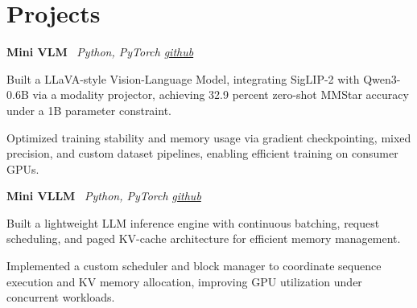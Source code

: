 \section{Projects}

    \hspace{0.5em} \textbf{Mini VLM} \textbar \  \textit{Python, PyTorch}
\hfill \textit{\href{https://github.com/knarfthekant/mini-vlm}{github}}
    \vspace{0.10 cm}
    \begin{onecolentry}
        \begin{highlights}
            \item Built a LLaVA-style Vision-Language Model, integrating SigLIP-2 with Qwen3-0.6B via a modality projector, achieving 32.9 percent zero-shot MMStar accuracy under a 1B parameter constraint.
            \item Optimized training stability and memory usage via gradient checkpointing, mixed precision, and custom dataset pipelines, enabling efficient training on consumer GPUs.
        \end{highlights}
    \end{onecolentry}
    \vspace{0.10 cm}

    \hspace{0.5em} \textbf{Mini VLLM} \textbar \  \textit{Python, PyTorch}
\hfill \textit{\href{https://github.com/knarfthekant/mini-vllm}{github}}
    \vspace{0.10 cm}
    \begin{onecolentry}
        \begin{highlights}
            \item Built a lightweight LLM inference engine with continuous batching, request scheduling, and paged KV-cache architecture for efficient memory management.
            \item Implemented a custom scheduler and block manager to coordinate sequence execution and KV memory allocation, improving GPU utilization under concurrent workloads.
        \end{highlights}
    \end{onecolentry}
    \vspace{0.10 cm}


